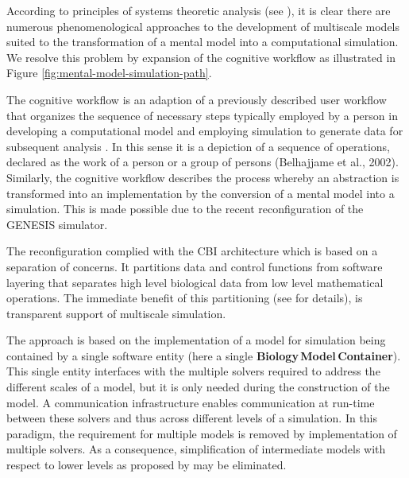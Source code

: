 \documentclass[11pt,3p,twocolumn]{JMN}
\begin{document}
According to principles of systems theoretic analysis (see \cite{Bertalanffy:1973zr,Heylighen:2006vn}), it is clear there are numerous phenomenological approaches to the development of multiscale models suited to the transformation of a mental model into a computational simulation. We resolve this problem by expansion of the cognitive workflow as illustrated in Figure \ref{fig:mental-model-simulation-path}.

The cognitive workflow is an adaption of a previously described user workflow that organizes the sequence of necessary steps typically employed by a person in developing a computational model and employing simulation to generate data for subsequent analysis \cite{cornelis12}. In this sense it is a depiction of a sequence of operations, declared as the work of a person or a group of persons (Belhajjame et al., 2002). Similarly, the cognitive workflow describes the process whereby an abstraction is transformed into an implementation by the conversion of a mental model into a simulation. This is made possible due to the recent reconfiguration of the GENESIS simulator. 

The reconfiguration complied with the CBI architecture which is based on a separation of concerns. It partitions data and control functions from software layering that separates high level biological data from low level mathematical operations. The immediate benefit of this partitioning (see \cite{cornelis12} for details), is transparent support of multiscale simulation.

The approach is based on the implementation of a model for simulation being contained by a single software entity (here a single {\bf Biology\,Model\,Container}). This single entity interfaces with the multiple solvers required to address the different scales of a model, but it is only needed during the construction of the model. A communication infrastructure enables communication at run-time between these solvers and thus across different levels of a simulation. In this paradigm, the requirement for multiple models is removed by implementation of multiple solvers. As a consequence, simplification of intermediate models with respect to lower levels as proposed by \cite{Sejnowski:1988fk} may be eliminated. 

\end{document}
